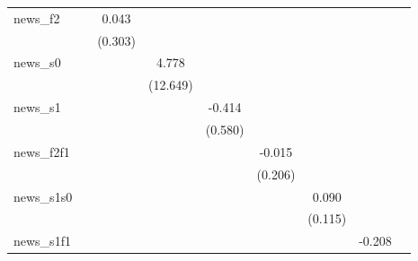 {\begin{tabular}{l*{8}{c}}
\addlinespace
news\_f2     &                     &       0.043         &                     &                     &                     &                     &                     &                     \\
            &                     &     (0.303)         &                     &                     &                     &                     &                     &                     \\
\addlinespace
news\_s0     &                     &                     &       4.778         &                     &                     &                     &                     &                     \\
            &                     &                     &    (12.649)         &                     &                     &                     &                     &                     \\
\addlinespace
news\_s1     &                     &                     &                     &      -0.414         &                     &                     &                     &                     \\
            &                     &                     &                     &     (0.580)         &                     &                     &                     &                     \\
\addlinespace
news\_f2f1   &                     &                     &                     &                     &      -0.015         &                     &                     &                     \\
            &                     &                     &                     &                     &     (0.206)         &                     &                     &                     \\
\addlinespace
news\_s1s0   &                     &                     &                     &                     &                     &       0.090         &                     &                     \\
            &                     &                     &                     &                     &                     &     (0.115)         &                     &                     \\
\addlinespace
news\_s1f1   &                     &                     &                     &                     &                     &                     &      -0.208         &                     \\

\end{tabular}}

